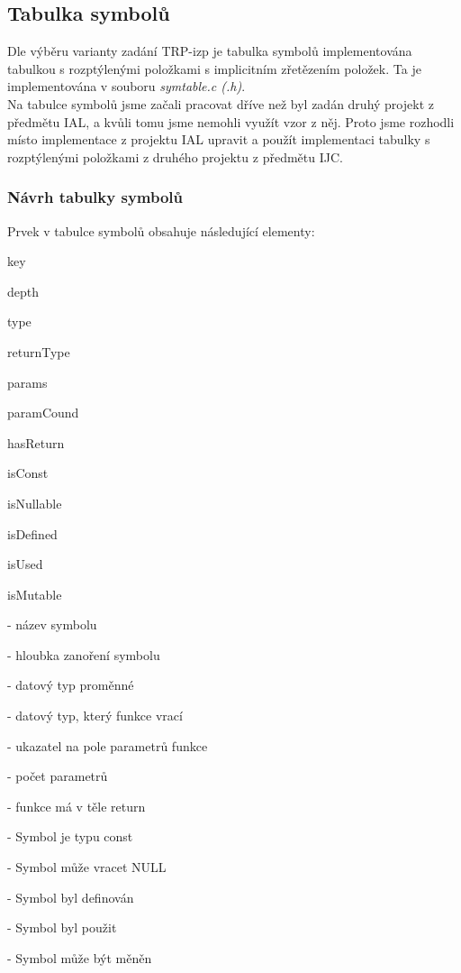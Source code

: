 \documentclass[a4paper, 12pt]{article}
\begin{document}
\newpage
{}
\subsection{Tabulka symbolů}
Dle výběru varianty zadání TRP-izp je tabulka symbolů implementována tabulkou s rozptýlenými položkami s implicitním zřetězením položek. Ta je implementována v souboru \textit{symtable.c (.h)}. 
\\Na tabulce symbolů jsme začali pracovat dříve než byl zadán druhý projekt z předmětu IAL, a kvůli tomu jsme nemohli využít vzor z něj. Proto jsme rozhodli místo implementace z projektu IAL upravit a použít implementaci tabulky s rozptýlenými položkami z druhého projektu z předmětu IJC.

\subsubsection{Návrh tabulky symbolů}
Prvek v tabulce symbolů obsahuje následující elementy:

\vspace{1cm}

\begin{itemize}
    \begin{minipage}{0.3\linewidth}   
    \item key
    \item depth
    \item type
    \item returnType
    \item params
    \item paramCound
    \item hasReturn
    \item isConst    
    \item isNullable
    \item isDefined
    \item isUsed
    \item isMutable
    \end{minipage}
    \begin{minipage}{0.65\linewidth}   
    \item[-] název symbolu
    \item[-] hloubka zanoření symbolu
    \item[-] datový typ proměnné
    \item[-] datový typ, který funkce vrací
    \item[-] ukazatel na pole parametrů funkce
    \item[-] počet parametrů
    \item[-] funkce má v těle return    
    \item[-] Symbol je typu const
    \item[-] Symbol může vracet NULL
    \item[-] Symbol byl definován
    \item[-] Symbol byl použit
    \item[-] Symbol může být měněn
    \end{minipage}
\end{itemize}
\end{document}
